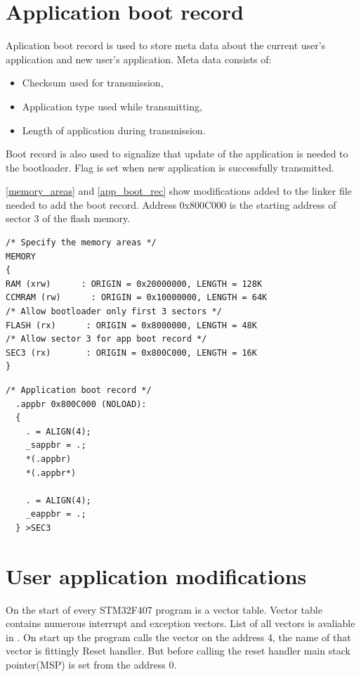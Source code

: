 \section{Application boot record}
\label{boot_record}

Aplication boot record is used to store meta data about the current user's application and new user's application. Meta data consists of: 
\begin{itemize}
    \item Checksum used for transmission,
    \item Application type used while transmitting,
    \item Length of application during transmission.
\end{itemize}
Boot record is also used to signalize that update of the application is needed to the bootloader. Flag is set when new application is successfully transmitted.

\autoref{memory_areas} and \autoref{app_boot_rec} show modifications added to the linker file needed to add the boot record. Address 0x800C000 is the starting address of sector 3 of the flash memory.

\begin{lstlisting}[frame=single, label={memory_areas}, caption={Memory areas from the linker file.}, captionpos=b]
/* Specify the memory areas */
MEMORY
{
RAM (xrw)      : ORIGIN = 0x20000000, LENGTH = 128K
CCMRAM (rw)      : ORIGIN = 0x10000000, LENGTH = 64K
/* Allow bootloader only first 3 sectors */
FLASH (rx)      : ORIGIN = 0x8000000, LENGTH = 48K 
/* Allow sector 3 for app boot record */
SEC3 (rx)		: ORIGIN = 0x800C000, LENGTH = 16K
}
\end{lstlisting}

\begin{lstlisting}[frame=single, label={app_boot_rec}, caption={Application boot record from the linker file.}, captionpos=b]
  /* Application boot record */
  .appbr 0x800C000 (NOLOAD):
  {
    . = ALIGN(4);
    _sappbr = .;       
    *(.appbr)
    *(.appbr*)
    
    . = ALIGN(4);
    _eappbr = .;   
  } >SEC3
\end{lstlisting}


\section{User application modifications}

On the start of every STM32F407 program is a vector table. Vector table contains numerous interrupt and exception vectors. List of all vectors is avaliable in \citep[p.~372]{stm32f407_ref_man}. On start up the program calls the vector on the address 4, the name of that vector is fittingly Reset handler. But before calling the reset handler main stack pointer(MSP) is set from the address 0. 


